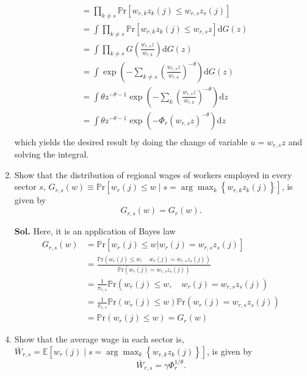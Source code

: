 \documentclass[12pt,oneside,reqno]{amsart}
\newcommand{\pr}{\mathbb{P}\mathrm{r}}
\begin{document}
\begin{enumerate}[leftmargin=15pt,label=\textbf{\roman*.}]
\begin{align*}
        &= \prod_{k\neq s}\pr\left[w_{r,k}z_k(j)\leq w_{r,s}z_s(j) \right] \\ 
        &= \int \prod_{k\neq s}\pr\left[w_{r,k}z_k(j)\leq w_{r,s}z \right]\mathrm{d}G(z) \\
        &= \int \prod_{k\neq s}G\left(\frac{w_{r,s}z}{w_{r,k}}\right)\mathrm{d}G(z) \\
        &= \int \exp\left(-\sum_{k\neq s}\left(\frac{w_{r,s}z}{w_{r,k}}\right)^{-\theta}\right)\mathrm{d}G(z) \\
        &= \int \theta z^{-\theta-1}\exp\left(-\sum_{k}\left(\frac{w_{r,s}z}{w_{r,k}}\right)^{-\theta}\right)\mathrm{d}z \\
        &= \int \theta z^{-\theta-1}\exp\left(-\Phi_{r}\left(w_{r,s}z\right)^{-\theta}\right)\mathrm{d}z \\
    \end{align*}
    which yields the desired result by doing the change of variable $u=w_{r,s}z$ and solving the integral. 
    \item Show that the distribution of regional wages of workers employed in every sector $s$, $G_{r, s}(w) \equiv \pr\left[w_{r}(j) \leq w \mid s=\arg \max _{k}\left\{w_{r, k} z_{k}(j)\right\}\right]$, is given by
    \begin{equation*}
        G_{r, s}(w)=G_{r}(w).
    \end{equation*}
    \item[\textbf{Sol.}] Here, it is an application of Bayes law
    \begin{align*}
        G_{r, s}(w) &= \pr\left[w_{r}(j) \leq w \bigg\vert w_r(j)=w_{r,s}z_s(j)\right] \\ 
                    &= \frac{\pr\left(w_{r}(j) \leq w,\quad w_r(j)=w_{r,s}z_s(j)\right)}{\pr\left(w_r(j)=w_{r,s}z_s(j) \right)} \\ 
                    &= \frac{1}{\pi_{r,s}}\pr\left(w_{r}(j) \leq w,\quad w_r(j)=w_{r,s}z_s(j)\right) \\ 
                    &= \frac{1}{\pi_{r,s}}\pr\left(w_{r}(j) \leq w\right)\pr\left( w_r(j)=w_{r,s}z_s(j)\right) \\
                    &= \pr\left(w_{r}(j) \leq w\right)=G_r(w)
    \end{align*}
    \item Show that the average wage in each sector is, $\bar{W}_{r, s}=\mathbb{E}\left[w_{r}(j) \mid s=\arg \max_{k}\left\{w_{r, k} z_{k}(j)\right\}\right]$, is given by
    \begin{equation*}
        \bar{W}_{r, s}=\gamma \Phi_{r}^{1 / \theta} .

\end{equation*}
\end{enumerate}
\end{document}
